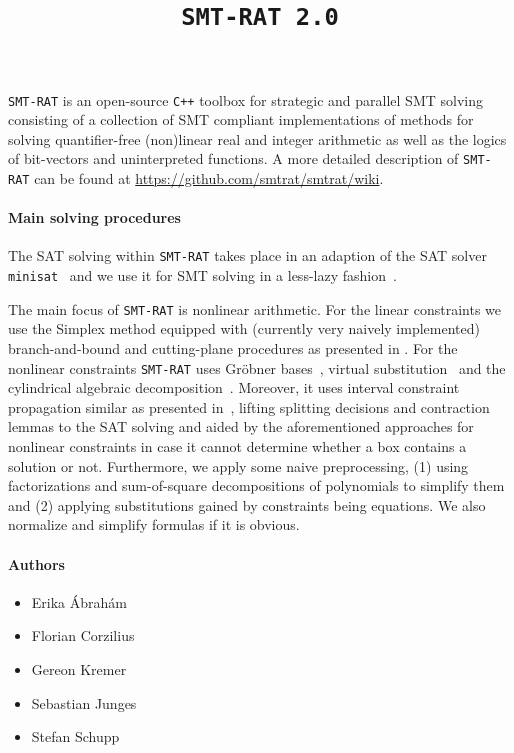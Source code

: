 \documentclass{article}
\title{\texttt{SMT-RAT 2.0}}
\begin{document}
\maketitle

\texttt{SMT-RAT} is an open-source \texttt{C++} toolbox for strategic and parallel SMT solving
consisting of a collection of SMT compliant implementations of methods for
solving quantifier-free (non)linear real and integer arithmetic as well as
the logics of bit-vectors and uninterpreted functions. A more detailed description of \texttt{SMT-RAT} can be found at \href{https://github.com/smtrat/smtrat/wiki}{\color{blue}https://github.com/smtrat/smtrat/wiki}.

\paragraph{Main solving procedures}

The SAT solving within \texttt{SMT-RAT} takes place in an adaption of the SAT solver \texttt{minisat}~\cite{minisat} and we use it for SMT solving in a less-lazy fashion~\cite{sebastiani2007lazy}.

The main focus of \texttt{SMT-RAT} is nonlinear arithmetic. For the linear constraints we use the Simplex method equipped with (currently very naively implemented) branch-and-bound and cutting-plane procedures as presented in \cite{DM06}. For the nonlinear constraints \texttt{SMT-RAT} uses Gr\"obner bases~\cite{JLCA_CAI13}, virtual substitution~\cite{Article_Corzilius_FCT2011} and the cylindrical algebraic decomposition~\cite{Article_Loup_TubeCAD}. Moreover, it uses interval constraint propagation similar as presented in~\cite{GGIGSC10}, lifting splitting decisions and contraction lemmas to the SAT solving and aided by the aforementioned approaches for nonlinear constraints in case it cannot determine whether a box contains a solution or not. Furthermore, we apply some naive preprocessing, (1) using factorizations and sum-of-square decompositions of polynomials to simplify them and (2) applying substitutions gained by constraints being equations. We also normalize and simplify formulas if it is obvious.

\paragraph{Authors}
\begin{itemize}
\item Erika \'Abrah\'am
\item Florian Corzilius
\item Gereon Kremer
\item Sebastian Junges
\item Stefan Schupp
\end{itemize}


  
\end{document}
